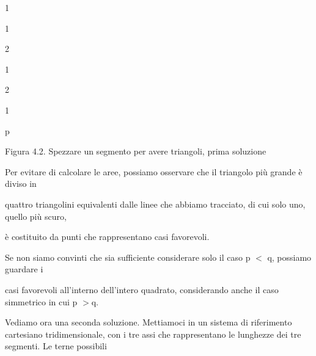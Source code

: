 \documentclass[a4paper,portrait,12pt]{article}
\begin{document}
1





1


2





1


2





1





\begin{flushleft}
p
\end{flushleft}





\begin{flushleft}
Figura 4.2. Spezzare un segmento per avere triangoli, prima soluzione
\end{flushleft}





\begin{flushleft}
Per evitare di calcolare le aree, possiamo osservare che il triangolo più grande \`{e} diviso in
\end{flushleft}


\begin{flushleft}
quattro triangolini equivalenti dalle linee che abbiamo tracciato, di cui solo uno, quello più scuro,
\end{flushleft}


\begin{flushleft}
\`{e} costituito da punti che rappresentano casi favorevoli.
\end{flushleft}


\begin{flushleft}
Se non siamo convinti che sia sufficiente considerare solo il caso p $<$ q, possiamo guardare i
\end{flushleft}


\begin{flushleft}
casi favorevoli all'interno dell'intero quadrato, considerando anche il caso simmetrico in cui p $>$q.
\end{flushleft}


\begin{flushleft}
Vediamo ora una seconda soluzione. Mettiamoci in un sistema di riferimento cartesiano tridimensionale, con i tre assi che rappresentano le lunghezze dei tre segmenti. Le terne possibili
\end{flushleft}
\end{document}
